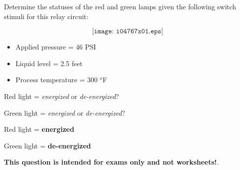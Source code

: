 

Determine the statuses of the red and green lamps given the following switch stimuli for this relay circuit:

$$\texttt{[image: i04767x01.eps]}$$

\begin{itemize}
\item{} Applied pressure = 46 PSI
\item{} Liquid level = 2.5 feet
\item{} Process temperature = 300 $^{o}$F
\end{itemize}

\vskip 10pt

Red light = {\it energized} or {\it de-energized}?

\vskip 10pt

Green light = {\it energized} or {\it de-energized}?







Red light = {\bf energized}

Green light = {\bf de-energized}







{\bf This question is intended for exams only and not worksheets!}.


